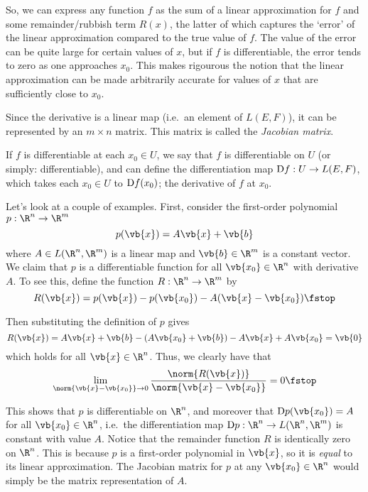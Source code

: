 So, we can express any function \( f \) as the sum of a linear approximation for \( f \) and some remainder/rubbish term \( R(x) \), the latter of which captures the `error' of the linear approximation compared to the true value of \( f \). The value of the error can be quite large for certain values of \( x \), but if \( f \) is differentiable, the error tends to zero as one approaches \( x_0 \). This makes rigourous the notion that the linear approximation can be made arbitrarily accurate for values of \( x \) that are sufficiently close to \( x_0 \).

\vspace{3mm}

Since the derivative is a linear map (i.e.\ an element of \( L(E,F) \)), it can be represented by an \( m\times n \) matrix. This matrix is called the \emph{Jacobian matrix}.

\vspace{3mm}

If \( f \) is differentiable at each \( x_0\in U \), we say that \( f \) is differentiable on \( U \) (or simply: differentiable), and can define the differentiation map \( \text{D} f:U\to L(E,F) \), which takes each \( x_0\in U \) to \( \text{D} f(x_0) \); the derivative of \( f \) at \( x_0 \).

\vspace{3mm}

Let's look at a couple of examples. First, consider the first-order polynomial \( p:\R^n\to\R^m \)
\[ p(\vb{x})=A\vb{x}+\vb{b} \]
where \( A\in L(\R^n,\R^m) \) is a linear map and \( \vb{b}\in\R^m \) is a constant vector. We claim that \( p \) is a differentiable function for all \( \vb{x_0}\in\R^n \) with derivative \( A \). To see this, define the function \( R:\R^n\to \R^m \) by
\[ R(\vb{x})=p(\vb{x})-p(\vb{x_0})-A(\vb{x}-\vb{x_0})\fstop \]

Then substituting the definition of \( p \) gives
\[ R(\vb{x})= A\vb{x}+\vb{b}-(A\vb{x_0}+\vb{b})-A\vb{x}+A\vb{x_0}=\vb{0}\]
which holds for all \( \vb{x}\in\R^n \). Thus, we clearly have that
\[ \lim_{\norm{\vb{x}-\vb{x_0}}\to 0}\frac{\norm{R(\vb{x})}}{\norm{\vb{x}-\vb{x_0}}}=0\fstop \]

This shows that \( p \) is differentiable on \( \R^n \), and moreover that \( \D p(\vb{x_0})=A \) for all \( \vb{x_0}\in\R^n \), i.e.\ the differentiation map \( \D p:\R^n\to L(\R^n,\R^m) \) is constant with value \( A \). Notice that the remainder function \( R \) is identically zero on \( \R^n \). This is because \( p \) is a first-order polynomial in \( \vb{x} \), so it is \emph{equal} to its linear approximation. The Jacobian matrix for \( p \) at any \( \vb{x_0}\in\R^n \) would simply be the matrix representation of \( A \).

